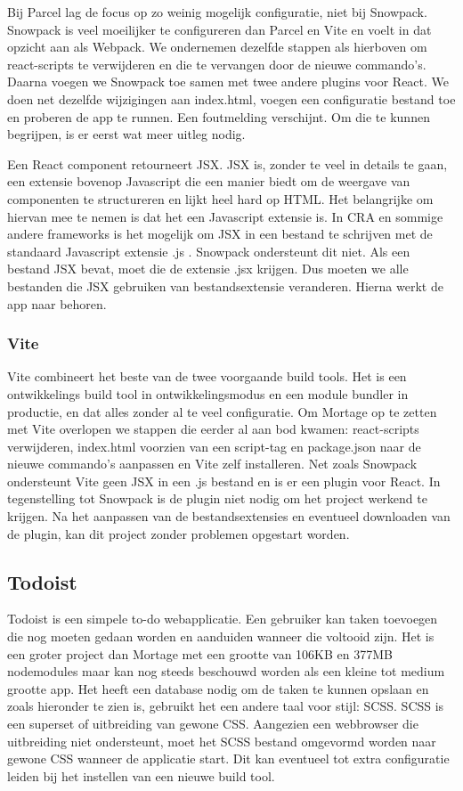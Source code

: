 Bij Parcel lag de focus op zo weinig mogelijk configuratie, niet bij Snowpack. Snowpack is veel moeilijker te configureren dan Parcel en Vite en voelt in dat opzicht aan als Webpack. We ondernemen dezelfde stappen als hierboven om react-scripts te verwijderen en die te vervangen door de nieuwe commando’s. Daarna voegen we Snowpack toe samen met twee andere plugins voor React. We doen net dezelfde wijzigingen aan index.html, voegen een configuratie bestand toe en proberen de app te runnen. Een foutmelding verschijnt. Om die te kunnen begrijpen, is er eerst wat meer uitleg nodig.

Een React component retourneert JSX. JSX is, zonder te veel in details te gaan, een extensie bovenop Javascript die een manier biedt om de weergave van componenten te structureren en lijkt heel hard op HTML. Het belangrijke om hiervan mee te nemen is dat het een Javascript extensie is. In CRA en sommige andere frameworks is het mogelijk om JSX in een bestand te schrijven met de standaard Javascript extensie .js . Snowpack ondersteunt dit niet. Als een bestand JSX bevat, moet die de extensie .jsx krijgen. Dus moeten we alle bestanden die JSX gebruiken van bestandsextensie veranderen. Hierna werkt de app naar behoren.

\subsubsection{Vite}

Vite combineert het beste van de twee voorgaande build tools. Het is een ontwikkelings build tool in ontwikkelingsmodus en een module bundler in productie, en dat alles zonder al te veel configuratie. Om Mortage op te zetten met Vite overlopen we stappen die eerder al aan bod kwamen: react-scripts verwijderen, index.html voorzien van een script-tag en package.json naar de nieuwe commando’s aanpassen en Vite zelf installeren. Net zoals Snowpack ondersteunt Vite geen JSX in een .js bestand en is er een plugin voor React. In tegenstelling tot Snowpack is de plugin niet nodig om het project werkend te krijgen. Na het aanpassen van de bestandsextensies en eventueel downloaden van de plugin, kan dit project zonder problemen opgestart worden.

\subsection{Todoist}

Todoist \autocite{hadwen-2021} is een simpele to-do webapplicatie. Een gebruiker kan taken toevoegen die nog moeten gedaan worden en aanduiden wanneer die voltooid zijn. Het is een groter project dan Mortage met een grootte van 106KB en 377MB nodemodules maar kan nog steeds beschouwd worden als een kleine tot medium grootte app. Het heeft een database nodig om de taken te kunnen opslaan en zoals hieronder te zien is, gebruikt het een andere taal voor stijl: SCSS. SCSS is een superset of uitbreiding van gewone CSS. Aangezien een webbrowser die uitbreiding niet ondersteunt, moet het SCSS bestand omgevormd worden naar gewone CSS wanneer de applicatie start. Dit kan eventueel tot extra configuratie leiden bij het instellen van een nieuwe build tool.

